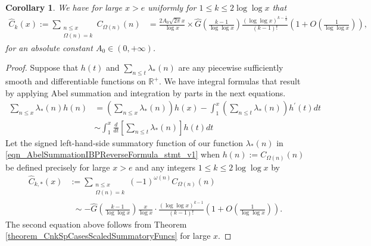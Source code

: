 \documentclass[11pt,reqno,a4letter]{article}
\numberwithin{figure}{section}
\numberwithin{table}{section}
\theoremstyle{plain}
\newtheorem{cor}[theorem]{Corollary}
\numberwithin{theorem}{section}
\theoremstyle{definition}
\begin{document}
\begin{cor} 
\label{cor_SummatoryFuncsOfUnsignedSeqs_v2} 
We have for large $x > e$ uniformly for $1 \leq k \leq 2\log\log x$ that  
\begin{align*} 
\widehat{C}_k(x) := 
     \sum_{\substack{n \leq x \\ \Omega(n) = k}} C_{\Omega(n)}(n) & 
     = \frac{2A_0 \sqrt{2\pi} x}{\log x} \times 
     \widehat{G}\left(\frac{k-1}{\log\log x}\right) 
     \frac{(\log\log x)^{k-\frac{1}{2}}}{(k-1)!} \left( 
     1 + O\left(\frac{1}{\log\log x}\right)\right), 
\end{align*} 
for an absolute constant $A_0 \in (0, +\infty)$. 
\end{cor} 
\begin{proof} 
Suppose that $h(t)$ and $\sum_{n \leq t} \lambda_{\ast}(n)$ are any 
piecewise sufficiently smooth and differentiable functions on $\mathbb{R}^{+}$. 
We have integral formulas that result by 
applying Abel summation and integration by parts in the next equations. 
\begin{subequations}
\begin{align} 
\label{eqn_AbelSummationIBPReverseFormula_stmt_v1} 
     \sum_{n \leq x} \lambda_{\ast}(n) h(n) & = \left(\sum_{n \leq x} \lambda_{\ast}(n)\right) h(x) - 
     \int_{1}^{x} \left(\sum_{n \leq t} \lambda_{\ast}(n)\right) h^{\prime}(t) dt \\ 
\label{eqn_AbelSummationIBPReverseFormula_stmt_v2}
     & \sim 
     \int_1^{x} \frac{d}{dt}\left[\sum_{n \leq t} \lambda_{\ast}(n)\right] h(t) dt
\end{align} 
\end{subequations}
Let the signed left-hand-side summatory function of our function $\lambda_{\ast}(n)$ 
in \eqref{eqn_AbelSummationIBPReverseFormula_stmt_v1} when $h(n) := C_{\Omega(n)}(n)$ be defined precisely 
for large $x > e$ and any integers $1 \leq k \leq 2\log\log x$ by 
\begin{align*} 
\widehat{C}_{k,\ast}(x) & := \sum_{\substack{n \leq x \\ \Omega(n)=k}} 
     (-1)^{\omega(n)} C_{\Omega(n)}(n) \\ 
     & \phantom{:} \sim 
     - \widehat{G}\left(\frac{k-1}{\log\log x}\right) 
     \frac{x}{\log x} \cdot \frac{(\log\log x)^{k-1}}{(k-1)!} \left( 
     1 + O\left(\frac{1}{\log\log x}\right)\right).
\end{align*} 
The second equation above follows from 
Theorem \ref{theorem_CnkSpCasesScaledSummatoryFuncs} for large $x$. 


\end{proof}
\end{document}
